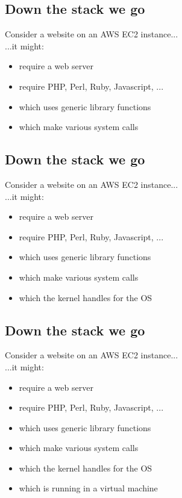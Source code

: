 \documentclass[xga]{xdvislides}
\begin{document}
\subsection{Down the stack we go}
Consider a website on an AWS EC2 instance...
\\

...it might:

\begin{itemize}
	\item require a web server
	\item require PHP, Perl, Ruby, Javascript, ...
	\item which uses generic library functions
	\item which make various system calls
\end{itemize}

\subsection{Down the stack we go}
Consider a website on an AWS EC2 instance...
\\

...it might:

\begin{itemize}
	\item require a web server
	\item require PHP, Perl, Ruby, Javascript, ...
	\item which uses generic library functions
	\item which make various system calls
	\item which the kernel handles for the OS
\end{itemize}

\subsection{Down the stack we go}
Consider a website on an AWS EC2 instance...
\\

...it might:

\begin{itemize}
	\item require a web server
	\item require PHP, Perl, Ruby, Javascript, ...
	\item which uses generic library functions
	\item which make various system calls
	\item which the kernel handles for the OS
	\item which is running in a virtual machine
\end{itemize}
\end{document}

